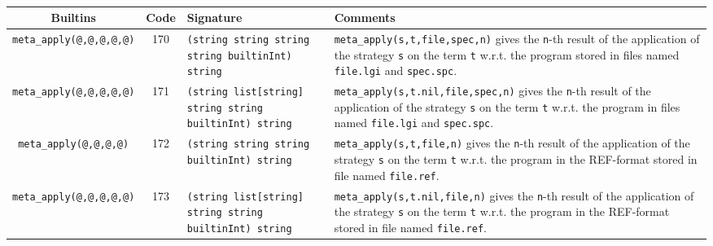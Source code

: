 ~\\
\begin{tabular}{|c|c|p{5cm}|p{6cm}|}
\hline
{\bf Builtins} & {\bf Code} & {\bf Signature} & {\bf Comments} \\
\hline
\hline
{\tt meta\_apply(@,@,@,@,@)}    & 170 & {\tt (string string string string builtinInt) string} & {\tt meta\_apply(s,t,file,spec,n)} gives the {\tt n}-th result of the application  of the strategy {\tt s} on the term {\tt t} w.r.t. the program stored in files named {\tt file.lgi} and {\tt spec.spc}.\\
{\tt meta\_apply(@,@,@,@,@)}    & 171 & {\tt (string list[string] string string builtinInt) string} & {\tt meta\_apply(s,t.nil,file,spec,n)} gives the {\tt n}-th result of the application of the strategy {\tt s} on the term {\tt t} w.r.t. the program in files named {\tt file.lgi} and {\tt spec.spc}.\\
{\tt meta\_apply(@,@,@,@)}      & 172 & {\tt (string string string builtinInt) string} & {\tt meta\_apply(s,t,file,n)} gives the {\tt n}-th result of the application of the strategy  {\tt s} on the term {\tt t} w.r.t. the program in the REF-format stored in file named {\tt file.ref}.\\
{\tt meta\_apply(@,@,@,@,@)}    & 173 & {\tt (string list[string] string string builtinInt) string} & {\tt meta\_apply(s,t.nil,file,n)} gives the {\tt n}-th result of the application of the strategy {\tt s} on the term {\tt t} w.r.t. the program in the REF-format stored in file named {\tt file.ref}.\\
\hline
\end{tabular}

